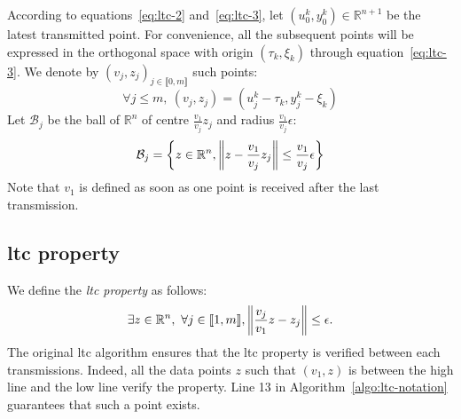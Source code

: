 According to equations~\eqref{eq:ltc-2} and~\eqref{eq:ltc-3}, let $(u_0^k,
y_0^k) \in \mathbb{R}^{n+1}$ be the latest transmitted point. For convenience,
all the subsequent points will be expressed in the orthogonal space with origin
$(\tau_k, \xi_k)$ through equation~\eqref{eq:ltc-3}. We denote by $(v_j, z_j)_{j
\in \llbracket 0, m \rrbracket}$ such points:
\begin{equation}
\forall j \leq m,\  (v_j, z_j) = (u_j^k - \tau_k, y_j^k - \xi_k)
\end{equation}
Let $\mathcal{B}_j$ be the ball of $\mathbb{R}^n$ of centre $\frac{v_1}{v_j}z_j$
and radius $\frac{v_1}{v_j}\epsilon$:
\begin{equation}
\mathcal{B}_j = \left\{ z \in \mathbb{R}^n,\left\lVert z-\frac{v_1}{v_j}z_j\right\rVert \leq\frac{v_1}{v_j}\epsilon \right\}
\end{equation}
Note that $v_1$ is defined as soon as one point is received after the last
transmission.

\subsection{\acrshort{ltc} property}
\label{sec:ltc-property}

We define the \emph{\acrshort{ltc} property} as follows:
\begin{equation}
\exists z \in \mathbb{R}^n, \ \forall j \in \llbracket 1, m \rrbracket, \left\lVert\frac{v_j}{v_1}z-z_j\right\rVert \leq
\epsilon.
\end{equation}
The original \acrshort{ltc} algorithm ensures that the \acrshort{ltc} property
is verified between each transmissions. Indeed, all the data points $z$ such
that $(v_1, z)$ is between the high line and the low line verify the property.
Line 13 in Algorithm~\ref{algo:ltc-notation} guarantees that such a point
exists.

